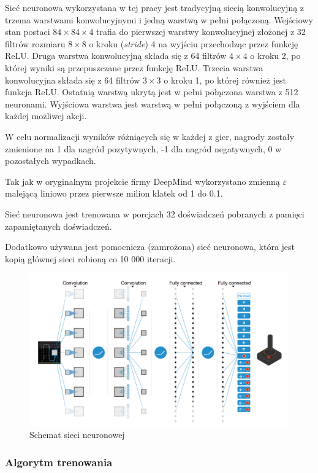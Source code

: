 \documentclass[12pt]{article}
\begin{document}
Sieć neuronowa wykorzystana w tej pracy jest tradycyjną siecią konwolucyjną z trzema warstwami konwolucyjnymi i jedną warstwą w pełni połączoną. Wejściowy stan postaci $84\times84\times4$ trafia do pierwszej warstwy konwolucyjnej złożonej z 32 filtrów rozmiaru $8\times8$ o kroku (\textit{stride}) 4 na wyjściu przechodząc przez funkcję ReLU. Druga warstwa konwolucyjną składa się z 64 filtrów $4\times4$ o kroku 2, po której wyniki są przepuszczane przez funkcję ReLU. Trzecia warstwa konwolucyjna składa się z 64 filtrów $3\times3$ o kroku 1, po której również jest funkcja ReLU. Ostatnią warstwą ukrytą jest w pełni połączona warstwa z 512 neuronami. Wyjściowa warstwa jest warstwą w pełni połączoną z wyjściem dla każdej możliwej akcji.

W celu normalizacji wyników różniących się w każdej z gier, nagrody zostały zmienione na 1 dla nagród pozytywnych, -1 dla nagród negatywnych, 0 w pozostałych wypadkach.

 Tak jak w oryginalnym projekcie firmy DeepMind wykorzystano zmienną $\varepsilon$ malejącą liniowo przez pierwsze milion klatek od 1 do 0.1.
 
Sieć neuronowa jest trenowana w porcjach 32 doświadczeń pobranych z pamięci zapamiętanych doświadczeń. 

Dodatkowo używana jest pomocnicza (zamrożona) sieć neuronowa, która jest kopią głównej sieci robioną co 10 000 iteracji. 

\begin{figure}[H]
\centering \includegraphics[scale=0.3]{network.png}
\caption{Schemat sieci neuronowej \cite{deepmind_2}}
\label{simple1}
\end{figure}


\subsubsection{Algorytm trenowania}
\end{document}
